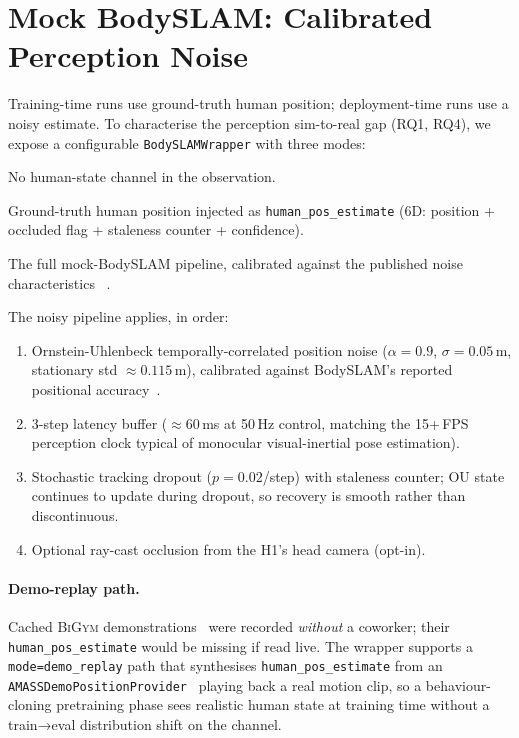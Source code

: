 \documentclass[11pt,a4paper]{report}
\newcommand{\bigym}{\textsc{BiGym}}
\newcommand{\bodyslampp}{BodySLAM\nolinebreak[4]\hspace{-.05em}\raisebox{.2ex}{\scriptsize ++}}
\begin{document}
\section{Mock \bodyslampp{}: Calibrated Perception Noise}
\label{sec:bench:perception}

Training-time runs use ground-truth human position; deployment-time
runs use a noisy estimate. To characterise the perception
sim-to-real gap (RQ1, RQ4), we expose a configurable
\texttt{BodySLAMWrapper} with three modes:

\begin{description}[leftmargin=2em,topsep=2pt,itemsep=2pt]
\item[\texttt{off}] No human-state channel in the observation.
\item[\texttt{oracle}] Ground-truth human position injected as
  \texttt{human\_pos\_estimate} (6D: position + occluded flag +
  staleness counter + confidence).
\item[\texttt{noisy}] The full mock-\bodyslampp{} pipeline, calibrated
  against the published noise characteristics ~\cite{henning2023bodyslampp}.
\end{description}

The noisy pipeline applies, in order:
\begin{enumerate}[topsep=2pt,itemsep=1pt]
\item Ornstein-Uhlenbeck temporally-correlated position noise
  ($\alpha = 0.9$, $\sigma = 0.05$\,m, stationary std $\approx
  0.115$\,m), calibrated against \bodyslampp{}'s reported
  positional accuracy~\cite{henning2023bodyslampp}.
\item 3-step latency buffer ($\approx 60$\,ms at 50\,Hz control,
  matching the 15+\,FPS perception clock typical of monocular
  visual-inertial pose estimation).
\item Stochastic tracking dropout ($p = 0.02$/step) with staleness
  counter; OU state continues to update during dropout, so
  recovery is smooth rather than discontinuous.
\item Optional ray-cast occlusion from the H1's head camera
  (opt-in).
\end{enumerate}

\paragraph{Demo-replay path.}
Cached \bigym{} demonstrations~\cite{chernyadev2024bigym} were
recorded \emph{without} a coworker; their
\texttt{human\_pos\_estimate} would be missing if read live. The
wrapper supports a \texttt{mode=demo\_replay} path that synthesises
\texttt{human\_pos\_estimate} from an
\texttt{AMASSDemoPositionProvider}~\cite{mahmood2019amass} playing
back a real motion clip, so a behaviour-cloning pretraining phase
sees realistic human state at training time without a train→eval
distribution shift on the channel.
\end{document}
